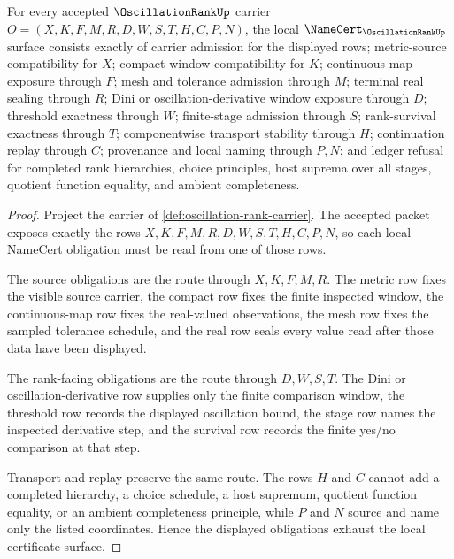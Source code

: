 \begin{theorem}
\label{thm:oscillation-rank-namecert-obligations}
For every accepted $\OscillationRankUp$ carrier $O=(X,K,F,M,R,D,W,S,T,H,C,P,N)$, the local $\NameCert_{\OscillationRankUp}$ surface consists exactly of carrier admission for the displayed rows; metric-source compatibility for $X$; compact-window compatibility for $K$; continuous-map exposure through $F$; mesh and tolerance admission through $M$; terminal real sealing through $R$; Dini or oscillation-derivative window exposure through $D$; threshold exactness through $W$; finite-stage admission through $S$; rank-survival exactness through $T$; componentwise transport stability through $H$; continuation replay through $C$; provenance and local naming through $P,N$; and ledger refusal for completed rank hierarchies, choice principles, host suprema over all stages, quotient function equality, and ambient completeness.
\end{theorem}
\begin{proof}
Project the carrier of \autoref{def:oscillation-rank-carrier}. The accepted packet exposes exactly the rows $X,K,F,M,R,D,W,S,T,H,C,P,N$, so each local NameCert obligation must be read from one of those rows.

The source obligations are the route through $X,K,F,M,R$. The metric row fixes the visible source carrier, the compact row fixes the finite inspected window, the continuous-map row fixes the real-valued observations, the mesh row fixes the sampled tolerance schedule, and the real row seals every value read after those data have been displayed.

The rank-facing obligations are the route through $D,W,S,T$. The Dini or oscillation-derivative row supplies only the finite comparison window, the threshold row records the displayed oscillation bound, the stage row names the inspected derivative step, and the survival row records the finite yes/no comparison at that step.

Transport and replay preserve the same route. The rows $H$ and $C$ cannot add a completed hierarchy, a choice schedule, a host supremum, quotient function equality, or an ambient completeness principle, while $P$ and $N$ source and name only the listed coordinates. Hence the displayed obligations exhaust the local certificate surface.
\end{proof}

